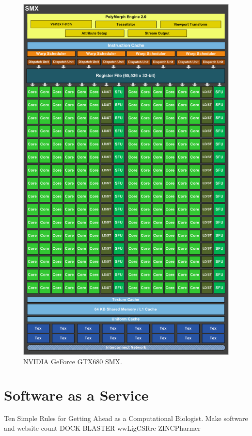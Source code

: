 \begin{figure}
\centering
\includegraphics[width=\textwidth]{Background/GeForceGTX680SMX.png}
\caption{NVIDIA GeForce GTX680 SMX.}
\label{Background:GeForceGTX680SMX}
\end{figure}

\section{Software as a Service}

Ten Simple Rules for Getting Ahead as a Computational Biologist. Make software and website count \citep{260}
DOCK BLASTER
wwLigCSRre
ZINCPharmer


\chapterend
